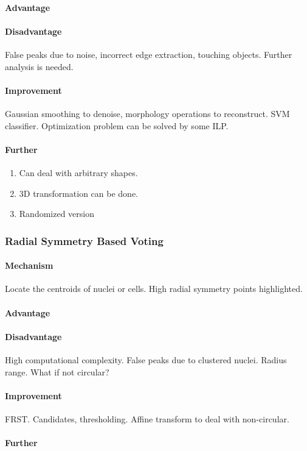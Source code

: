 \documentclass[10pt,a4paper]{article}
\begin{document}
\paragraph{Advantage}
\paragraph{Disadvantage}
False peaks due to noise, incorrect edge extraction, touching objects. Further analysis is needed. 
\paragraph{Improvement}
Gaussian smoothing to denoise, morphology operations to reconstruct. SVM classifier. Optimization problem can be solved by some ILP.
\paragraph{Further}
\begin{enumerate}
	\item Can deal with arbitrary shapes. 
	\item 3D transformation can be done.
	\item Randomized version
\end{enumerate}

\subsubsection{Radial Symmetry Based Voting}
\paragraph{Mechanism}
Locate the centroids of nuclei or cells. High radial symmetry points highlighted.
\paragraph{Advantage}
\paragraph{Disadvantage}
High computational complexity. False peaks due to clustered nuclei. Radius range. What if not circular?
\paragraph{Improvement}
FRST. Candidates, thresholding. Affine transform to deal with non-circular.
\paragraph{Further}
\end{document}
